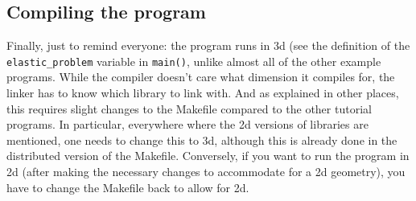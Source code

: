 \documentclass{article}
\begin{document}
\subsection*{Compiling the program}

Finally, just to remind everyone: the program runs in 3d (see the definition
of the \texttt{elastic\_problem} variable in \texttt{main()}, unlike almost
all of the other example programs. While the compiler doesn't care what
dimension it compiles for, the linker has to know which library to link with.
And as explained in other places, this requires slight changes to the Makefile
compared to the other tutorial programs. In particular, everywhere where the
2d versions of libraries are mentioned, one needs to change this to 3d,
although this is already done in the distributed version of the Makefile.
Conversely, if you want to run the program in 2d (after making the necessary
changes to accommodate for a 2d geometry), you have to change the Makefile
back to allow for 2d.
\end{document}
